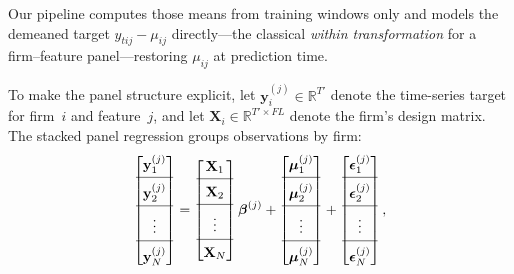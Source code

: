 \documentclass[pdflatex,sn-mathphys-num]{sn-jnl}%
\theoremstyle{thmstyleone}%
\theoremstyle{thmstyletwo}%
\theoremstyle{thmstylethree}%
\begin{document}
Our pipeline computes those means from training windows only and models the demeaned target $y_{tij}-\mu_{ij}$ directly---the classical \emph{within transformation} for a firm--feature panel---restoring $\mu_{ij}$ at prediction time.

To make the panel structure explicit, let $\mathbf{y}_i^{(j)} \in \mathbb{R}^{T'}$ denote the time-series target for firm~$i$ and feature~$j$, and let $\mathbf{X}_i \in \mathbb{R}^{T' \times FL}$ denote the firm's design matrix. The stacked panel regression groups observations by firm:
\begin{equation} \label{eq:ridge_panel}
\begin{bmatrix}
\mathbf{y}_{1}^{(j)} \\[2pt]
\hline
\\[-8pt]
\mathbf{y}_{2}^{(j)} \\[2pt]
\hline
\\[-8pt]
\vdots \\[2pt]
\hline
\\[-8pt]
\mathbf{y}_{N}^{(j)}
\end{bmatrix}
=
\begin{bmatrix}
\mathbf{X}_{1} \\[2pt]
\hline
\\[-8pt]
\mathbf{X}_{2} \\[2pt]
\hline
\\[-8pt]
\vdots \\[2pt]
\hline
\\[-8pt]
\mathbf{X}_{N}
\end{bmatrix}
\boldsymbol{\beta}^{(j)}
+
\begin{bmatrix}
\boldsymbol{\mu}_{1}^{(j)} \\[2pt]
\hline
\\[-8pt]
\boldsymbol{\mu}_{2}^{(j)} \\[2pt]
\hline
\\[-8pt]
\vdots \\[2pt]
\hline
\\[-8pt]
\boldsymbol{\mu}_{N}^{(j)}
\end{bmatrix}
+
\begin{bmatrix}
\boldsymbol{\epsilon}_{1}^{(j)} \\[2pt]
\hline
\\[-8pt]
\boldsymbol{\epsilon}_{2}^{(j)} \\[2pt]
\hline
\\[-8pt]
\vdots \\[2pt]
\hline
\\[-8pt]
\boldsymbol{\epsilon}_{N}^{(j)}
\end{bmatrix},
\end{equation}
\end{document}
